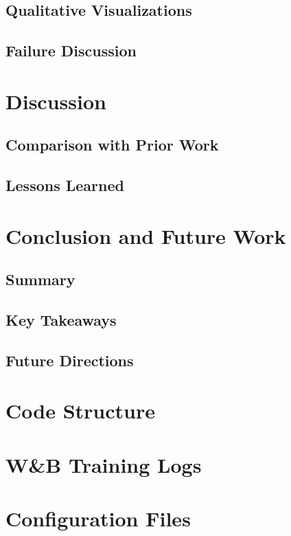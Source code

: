 \documentclass[a4paper,12pt]{article}
\begin{document}
\section{Qualitative Visualizations}

\section{Failure Discussion}

\chapter{Discussion}
\section{Comparison with Prior Work}

\section{Lessons Learned}

\chapter{Conclusion and Future Work}
\section{Summary}

\section{Key Takeaways}

\section{Future Directions}

\clearpage

\appendix
\chapter{Code Structure}

\chapter{W\&B Training Logs}

\chapter{Configuration Files}
\end{document}
